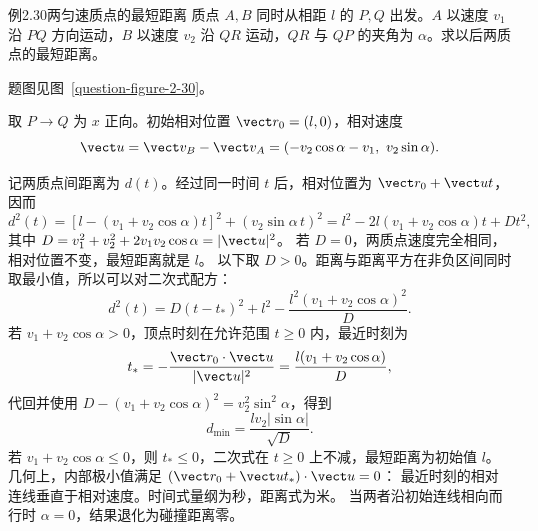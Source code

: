 \begin{origexamplebox}{例2.30\quad 两匀速质点的最短距离}
质点 $A,B$ 同时从相距 $l$ 的 $P,Q$ 出发。$A$ 以速度 $v_1$ 沿 $PQ$ 方向运动，$B$ 以速度 $v_2$ 沿 $QR$ 运动，$QR$ 与 $QP$ 的夹角为 $\alpha$。求以后两质点的最短距离。
\par 题图见图~\ref{question-figure-2-30}。
\KQuestionBE
\end{origexamplebox}
\begin{xesolution}
取 $P\to Q$ 为 $x$ 正向。初始相对位置 $\vect r_0=(l,0)$，相对速度
\[
\vect u=\vect v_B-\vect v_A=(-v_2\cos\alpha-v_1,\ v_2\sin\alpha).
\]
\TwoParticlesMinimumDistanceDiagram

记两质点间距离为 $d(t)$。经过同一时间 $t$ 后，相对位置为 $\vect r_0+\vect ut$，因而
\[
 d^2(t)=[l-(v_1+v_2\cos\alpha)t]^2+(v_2\sin\alpha\,t)^2
 =l^2-2l(v_1+v_2\cos\alpha)t+Dt^2,
\]
其中 $D=v_1^2+v_2^2+2v_1v_2\cos\alpha=|\vect u|^2$。
若 $D=0$，两质点速度完全相同，相对位置不变，最短距离就是 $l$。
以下取 $D>0$。距离与距离平方在非负区间同时取最小值，所以可以对二次式配方：
\[
 d^2(t)=D(t-t_*)^2+l^2-\frac{l^2(v_1+v_2\cos\alpha)^2}{D}.
\]
若 $v_1+v_2\cos\alpha>0$，顶点时刻在允许范围 $t\ge0$ 内，最近时刻为
\[
t_*=-\frac{\vect r_0\cdot\vect u}{|\vect u|^2}
=\frac{l(v_1+v_2\cos\alpha)}{D},
\]
代回并使用
$D-(v_1+v_2\cos\alpha)^2=v_2^2\sin^2\alpha$，得到
\[
\boxed{d_{\min}=\frac{lv_2|\sin\alpha|}{\sqrt D}}.
\]
若 $v_1+v_2\cos\alpha\le0$，则 $t_*\le0$，二次式在 $t\ge0$ 上不减，最短距离为初始值 $\boxed l$。
几何上，内部极小值满足 $(\vect r_0+\vect ut_*)\cdot\vect u=0$：
最近时刻的相对连线垂直于相对速度。时间式量纲为秒，距离式为米。
当两者沿初始连线相向而行时 $\alpha=0$，结果退化为碰撞距离零。
\end{xesolution}


